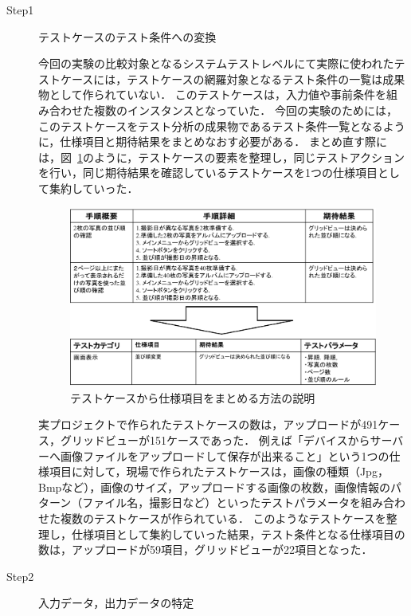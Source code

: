 \begin{description}

\item[Step1] テストケースのテスト条件への変換


今回の実験の比較対象となるシステムテストレベルにて実際に使われたテストケースには，テストケースの網羅対象となるテスト条件の一覧は成果物として作られていない．
このテストケースは，入力値や事前条件を組み合わせた複数のインスタンスとなっていた．
今回の実験のためには，このテストケースをテスト分析の成果物であるテスト条件一覧となるように，仕様項目と期待結果をまとめなおす必要がある．
まとめ直す際には，図~\ref{fig:D-4-Fig8}のように，テストケースの要素を整理し，同じテストアクションを行い，同じ期待結果を確認しているテストケースを1つの仕様項目として集約していった．

\begin{figure}[htbp]
\begin{center}
\includegraphics[width=12cm]{./image/D-4-Fig8.png}
\caption{テストケースから仕様項目をまとめる方法の説明}
\label{fig:D-4-Fig8}
\end{center}
\end{figure}

実プロジェクトで作られたテストケースの数は，アップロードが491ケース，グリッドビューが151ケースであった．
例えば「デバイスからサーバーへ画像ファイルをアップロードして保存が出来ること」という1つの仕様項目に対して，現場で作られたテストケースは，画像の種類（Jpg，Bmpなど），画像のサイズ，アップロードする画像の枚数，画像情報のパターン（ファイル名，撮影日など）といったテストパラメータを組み合わせた複数のテストケースが作られている．
このようなテストケースを整理し，仕様項目として集約していった結果，テスト条件となる仕様項目の数は，アップロードが59項目，グリッドビューが22項目となった．


\item[Step2] 入力データ，出力データの特定


\end{description}
